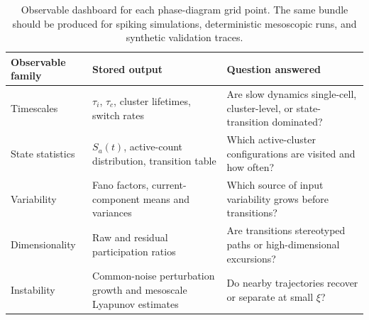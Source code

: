 \begin{table}[t]
\centering
\small
\begin{tabularx}{\textwidth}{@{}p{}p{}X@{}}
\toprule
\textbf{Observable family} & \textbf{Stored output} & \textbf{Question answered} \\
\midrule
Timescales & \(\tau_i\), \(\tau_c\), cluster lifetimes, switch rates & Are slow dynamics single-cell, cluster-level, or state-transition dominated? \\
State statistics & \(S_a(t)\), active-count distribution, transition table & Which active-cluster configurations are visited and how often? \\
Variability & Fano factors, current-component means and variances & Which source of input variability grows before transitions? \\
Dimensionality & Raw and residual participation ratios & Are transitions stereotyped paths or high-dimensional excursions? \\
Instability & Common-noise perturbation growth and mesoscale Lyapunov estimates & Do nearby trajectories recover or separate at small \(\xi\)? \\
\bottomrule
\end{tabularx}
\caption{Observable dashboard for each phase-diagram grid point. The same
bundle should be produced for spiking simulations, deterministic mesoscopic
runs, and synthetic validation traces.}
\label{tab:ch10-observable-dashboard}
\end{table}

